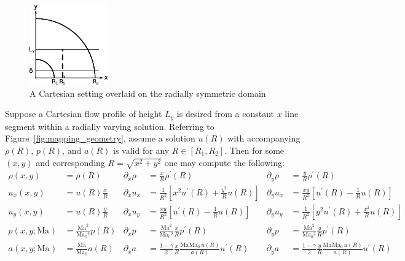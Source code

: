 \documentclass[letterpaper,11pt,nointlimits,reqno]{amsart}
\newcommand{\Mach}[1][]{\mbox{Ma}_{#1}}
\begin{document}
\begin{figure}[h]
  \centering
  \includegraphics[width=0.30\textwidth]{nozzle_schematic}
  \caption{
      \label{fig:mapping_geometry}
      A Cartesian setting overlaid on the radially symmetric domain
  }
\end{figure}
%
Suppose a Cartesian flow profile of height $L_y$ is desired from a constant $x$
line segment within a radially varying solution.
Referring to Figure~\eqref{fig:mapping_geometry}, assume a solution
$u\!\left(R\right)$ with accompanying $\rho\!\left(R\right)$,
$p\!\left(R\right)$, and $a\!\left(R\right)$ is valid for any
$R\in\left[R_1,R_2\right]$.  Then for some $\left(x,y\right)$ and corresponding
$R=\sqrt{x^2+y^2}$ one may compute the following:
%
\begin{align}
              \rho \!\left(x, y\right)        &= \rho\!\left(R\right)
 & \partial_x \rho                            &= \frac{x}{R} \rho^\prime\!\left(R\right)
 & \partial_y \rho                            &= \frac{y}{R} \rho^\prime\!\left(R\right)
\\            u_x  \!\left(x, y\right)        &= u   \!\left(R\right) \frac{x}{R}
 & \partial_x u_x                             &= \frac{1}{R^2}\left[x^2 u^\prime\!\left(R\right) + \frac{y^2}{R} u\!\left(R\right)\right]
 & \partial_y u_x                             &= \frac{xy}{R^2}\left[u^\prime\!\left(R\right) - \frac{1}{R}u\!\left(R\right)\right]
\\            u_y  \!\left(x, y\right)        &= u   \!\left(R\right) \frac{y}{R}
 & \partial_x u_y                             &= \frac{xy}{R^2}\left[u^\prime\!\left(R\right) - \frac{1}{R}u\!\left(R\right)\right]
 & \partial_y u_y                             &= \frac{1}{R^2}\left[y^2 u^\prime\!\left(R\right) + \frac{x^2}{R} u\!\left(R\right)\right]
\\            p    \!\left(x, y; \Mach\right) &= \frac{\Mach^2}{\Mach[0]{}^2} p   \!\left(R\right)
 & \partial_x p                               &= \frac{\Mach^2}{\Mach[0]{}^2}\frac{x}{R} p^\prime\!\left(R\right)
 & \partial_y p                               &= \frac{\Mach^2}{\Mach[0]{}^2}\frac{y}{R} p^\prime\!\left(R\right)
\\            a    \!\left(x, y; \Mach\right) &= \frac{\Mach  }{\Mach[0]{}  } a   \!\left(R\right)
 & \partial_x a                               &= \frac{1-\gamma}{2}\frac{x}{R}\frac{\Mach{}\Mach[0]{}\,u\!\left(R\right)}{a\!\left(R\right)} u^\prime\!\left(R\right)
 & \partial_y a                               &= \frac{1-\gamma}{2}\frac{y}{R}\frac{\Mach{}\Mach[0]{}\,u\!\left(R\right)}{a\!\left(R\right)} u^\prime\!\left(R\right)
\end{align}
\end{document}
